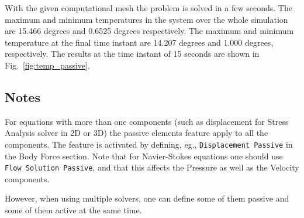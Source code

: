 With the given computational mesh the problem is solved in a few
seconds. The maximum and minimum temperatures in the system over the
whole simulation are 15.466 degrees and 0.6525 degrees
respectively. The maximum and minimum temperature at the final time
instant are 14.207 degrees and 1.000 degrees, respectively.  The
results at the time instant of 15 seconds are shown in
Fig.~\ref{fig:temp_passive}.


\subsection*{Notes}

For equations with more than one components (such as displacement for
Stress Analysis solver in 2D or 3D) the passive elements feature apply
to all the components. The feature is activated by defining, eg.,
\texttt{Displacement Passive} in the Body Force section. Note that
for Navier-Stokes equations one should use \texttt{Flow Solution
  Passive}, and that this affects the Pressure as well as the Velocity
components. 

However, when using multiple solvers, one can define some of them
passive and some of them active at the same time.


\hfill
